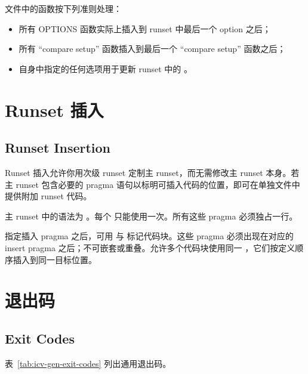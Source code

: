  文件中的函数按下列准则处理：
\begin{itemize}
  \item 所有 OPTIONS 函数实际上插入到 runset 中最后一个 option 之后；
  \item 所有 ``compare setup'' 函数插入到最后一个 ``compare setup'' 函数之后；
  \item {} 自身中指定的任何选项用于更新 runset 中的 。
\end{itemize}

\section{Runset 插入}
\subsection*{Runset Insertion}

Runset 插入允许你用次级 runset 定制主 runset，而无需修改主 runset 本身。若主 runset 包含必要的 pragma 语句以标明可插入代码的位置，即可在单独文件中提供附加 runset 代码。

主 runset 中的语法为 。每个  只能使用一次。所有这些 pragma 必须独占一行。

指定插入 pragma 之后，可用  与  标记代码块。这些 pragma 必须出现在对应的 insert pragma 之后；不可嵌套或重叠。允许多个代码块使用同一 ，它们按定义顺序插入到同一目标位置。

\section{退出码}
\subsection*{Exit Codes}

表~\ref{tab:icv-gen-exit-codes} 列出通用退出码。

